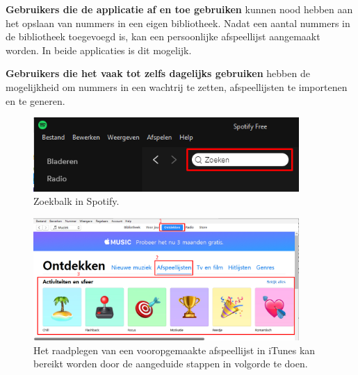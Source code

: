 \documentclass[11pt]{article}
\begin{document}
\textbf{Gebruikers die de applicatie af en toe gebruiken} kunnen nood hebben aan het opslaan van nummers in een eigen bibliotheek. Nadat een aantal nummers in de bibliotheek toegevoegd is, kan een persoonlijke afspeellijst aangemaakt worden. In beide applicaties is dit mogelijk.

\textbf{Gebruikers die het vaak tot zelfs dagelijks gebruiken} hebben de mogelijkheid om nummers in een wachtrij te zetten, afspeellijsten te importenen en te generen.
\begin{figure}
	\centering
	\includegraphics[width=0.9\textwidth]{SZoek.png}
	\caption{Zoekbalk in Spotify.}
	\label{fig:SZoek}
\end{figure}
\begin{figure}
	\centering
	\includegraphics[width=0.9\textwidth]{IAfspeellijst.png}
	\caption{Het raadplegen van een vooropgemaakte afspeellijst in iTunes kan bereikt worden door de aangeduide stappen in volgorde te doen.}
	\label{fig:IAfspeellijst}
\end{figure}
\end{document}
